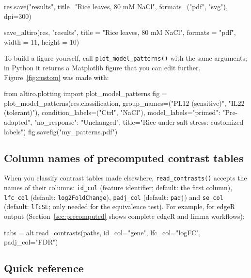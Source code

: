 \documentclass[11pt,a4paper]{article}
\newcommand{\code}[1]{\texttt{\color{navy!85!black}#1}}
\begin{document}
\begin{pycode}
res.save("results", title="Rice leaves, 80 mM NaCl", formats=("pdf", "svg"), dpi=300)
\end{pycode}
\begin{rcode}
save_altiro(res, "results", title = "Rice leaves, 80 mM NaCl",
            formats = "pdf", width = 11, height = 10)
\end{rcode}

To build a figure yourself, call \code{plot\_model\_patterns()} with the same arguments; in Python it
returns a Matplotlib figure that you can edit further. Figure~\ref{fig:custom} was made with:

\begin{pycode}
from altiro.plotting import plot_model_patterns
fig = plot_model_patterns(res.classification,
        group_names=("PL12 (sensitive)", "IL22 (tolerant)"),
        condition_labels=("Ctrl", "NaCl"),
        model_labels={"primed": "Pre-adapted", "no_response": "Unchanged"},
        title="Rice under salt stress: customized labels")
fig.savefig("my_patterns.pdf")
\end{pycode}

\subsection{Column names of precomputed contrast tables}

When you classify contrast tables made elsewhere, \code{read\_contrasts()} accepts the names of
their columns: \code{id\_col} (feature identifier; default: the first column), \code{lfc\_col}
(default: \code{log2FoldChange}), \code{padj\_col} (default: \code{padj}) and \code{se\_col}
(default: \code{lfcSE}; only needed for the equivalence test). For example, for edgeR output (Section~\ref{sec:precomputed} shows complete edgeR and limma workflows):

\begin{pycode}
tabs = alt.read_contrasts(paths, id_col="gene", lfc_col="logFC", padj_col="FDR")
\end{pycode}

\subsection{Quick reference}
\end{document}
